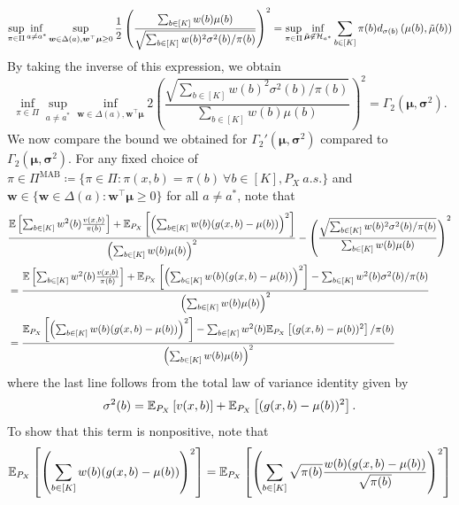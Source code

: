 \documentclass{article}
\begin{document}
\begin{appendices}
\begin{equation}
    \sup_{\pi \in \Pi}\inf_{a \neq a^*}\sup_{\boldsymbol{w} \in \Delta(a), \boldsymbol{w}^\top \boldsymbol{\mu}\geq 0}\frac{1}{2}\left( \frac{\sum_{b \in [K]}w(b) \mu(b)}{\sqrt{\sum_{b \in [K]} w(b)^2\sigma^2(b)/\pi(b)}}\right)^2 = \sup_{\pi \in \Pi}\inf_{\tilde{\boldsymbol\mu} \not\in \mathcal{H}_{a^*}} \sum_{b \in [K]}\pi(b)  d_{\sigma(b)}\left(\mu(b), \tilde{\mu}(b)\right)
\end{equation}
By taking the inverse of this expression, we obtain
\begin{equation}
    \inf_{\pi \in \Pi} \sup_{a \neq a^*} \inf_{\bm{w}\in \Delta(a), \bm{w}^\top \bm{\mu}} 2\left( \frac{\sqrt{\sum_{b \in [K]} w(b)^2\sigma^2(b)/\pi(b)}}{\sum_{b \in [K]}w(b) \mu(b)}\right)^2 = \Gamma_2(\bm\mu, \bm\sigma^2).
\end{equation}
We now compare the bound we obtained for $\Gamma_2'(\bm\mu, \bm\sigma^2)$ compared to $\Gamma_2(\bm{\mu}, \bm\sigma^2)$. For any fixed choice of $\pi \in \Pi^{\text{MAB}} \coloneqq \{\pi \in \Pi: \pi(x,b) = \pi(b) \ \forall b \in [K], P_X \ a.s.\}$ and $\bm{w} \in \{\bm{w} \in \Delta(a): \bm{w}^\top \bm\mu \geq 0\}$ for all $a \neq a^*$, note that
\begin{align}
    &\frac{\mathbb{E}\left[\sum_{b \in [K]} w^2(b)\frac{v(x,b)}{\pi(b)}\right] + \mathbb{E}_{P_X}\left[\left(\sum_{b \in [K]} w(b) (g(x,b) - \mu(b))\right)^2\right]}{\left( \sum_{b \in [K]} w(b) \mu(b) \right)^2} - \left( \frac{\sqrt{\sum_{b \in [K]} w(b)^2\sigma^2(b)/\pi(b)}}{\sum_{b \in [K]}w(b) \mu(b)}\right)^2  \\
    &=\frac{\mathbb{E}\left[\sum_{b \in [K]} w^2(b) \frac{v(x,b)}{\pi(b)}\right] + \mathbb{E}_{P_X}\left[\left(\sum_{b \in [K]} w(b) (g(x,b) - \mu(b))\right)^2\right] - \sum_{b \in [K]} w^2(b)\sigma^2(b)/\pi(b)}{\left(\sum_{b \in [K]} w(b) \mu(b) \right)^2}\\
    &= \frac{\mathbb{E}_{P_X}\left[\left(\sum_{b \in [K]} w(b) (g(x,b) - \mu(b))\right)^2\right] - \sum_{b \in [K]}w^2(b)\mathbb{E}_{P_X}\left[(g(x,b)- \mu(b))^2\right]/ \pi(b)}{\left(\sum_{b \in [K]} w(b) \mu(b) \right)^2}\label{eq:law_of_total_variance}
\end{align}
where the last line follows from the total law of variance identity given by
\begin{equation}
    \sigma^2(b) = \mathbb{E}_{P_X}\left[ v(x,b) \right] + \mathbb{E}_{P_X}\left[(g(x,b)- \mu(b))^2\right].
\end{equation}
To show that this term is nonpositive, note that
\begin{align}
    \EE_{P_X}\left[\left(\sum_{b \in [K]} w(b) (g(x,b) - \mu(b))\right)^2\right] &= \EE_{P_X}\left[ \left(\sum_{b \in [K]} \sqrt{\pi(b)}\frac{w(b)(g(x,b)-\mu(b))}{\sqrt{\pi(b)}} \right)^2\right]\\

\end{align}
\end{appendices}
\end{document}
